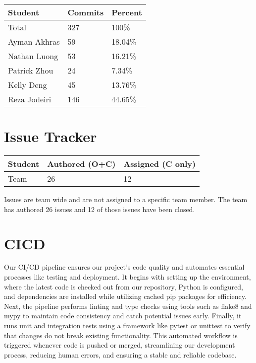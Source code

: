 \documentclass{article}
\begin{document}
\begin{table}[H]
\centering
\begin{tabular}{lll}
\toprule
\textbf{Student} & \textbf{Commits} & \textbf{Percent}\\
\midrule
Total & 327 & 100\% \\
Ayman Akhras & 59 & 18.04\%\\
Nathan Luong & 53 & 16.21\%\\
Patrick Zhou & 24 & 7.34\%\\
Kelly Deng & 45 & 13.76\%\\
Reza Jodeiri & 146 & 44.65\%\\
\bottomrule
\end{tabular}
\end{table}



\section{Issue Tracker}

\begin{table}[H]
\centering
\begin{tabular}{lll}
\toprule
\textbf{Student} & \textbf{Authored (O+C)} & \textbf{Assigned (C only)}\\
\midrule
Team & 26 & 12 \\
\bottomrule
\end{tabular}
\end{table}

Issues are team wide and are not assigned to a specific team member. The team has authored 26 issues and 12 of those issues have been closed.
\section{CICD}

Our CI/CD pipeline ensures our project's code quality and automates essential processes like testing and deployment. It begins with setting up the environment, where the latest code is checked out from our repository, Python is configured, and dependencies are installed while utilizing cached pip packages for efficiency. Next, the pipeline performs linting and type checks using tools such as flake8 and mypy to maintain code consistency and catch potential issues early. Finally, it runs unit and integration tests using a framework like pytest or unittest to verify that changes do not break existing functionality. This automated workflow is triggered whenever code is pushed or merged, streamlining our development process, reducing human errors, and ensuring a stable and reliable codebase.
\end{document}
